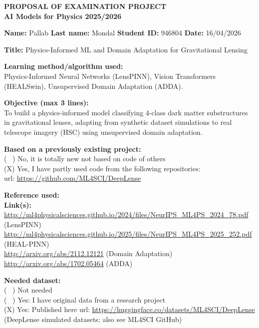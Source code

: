 \documentclass[12pt]{article}
\begin{document}
\begin{center}
    \textbf{\Large PROPOSAL OF EXAMINATION PROJECT} \\
    \vspace{0.2cm}
    \textbf{\large AI Models for Physics 2025/2026}
\end{center}

\vspace{0.5cm}

\noindent
\textbf{Name:} Pallab \hspace{1cm} \textbf{Last name:} Mondal \hspace{1cm} \textbf{Student ID:} 946804 \hspace{1cm} \textbf{Date:} 16/04/2026

\vspace{0.5cm}

\noindent
\textbf{Title:} Physics-Informed ML and Domain Adaptation for Gravitational Lensing

\vspace{0.5cm}

\noindent
\textbf{Learning method/algorithm used:} \\
Physics-Informed Neural Networks (LensPINN), Vision Transformers (HEALSwin), Unsupervised Domain Adaptation (ADDA).

\vspace{0.5cm}

\noindent
\textbf{Objective (max 3 lines):} \\
To build a physics-informed model classifying 4-class dark matter substructures in gravitational lenses, adapting from synthetic dataset simulations to real telescope imagery (HSC) using unsupervised domain adaptation.

\vspace{0.5cm}

\noindent
\textbf{Based on a previously existing project:} \\
( \ ) No, it is totally new not based on code of others \\
(X) Yes, I have partly used code from the following repositories: \\
url: \url{https://github.com/ML4SCI/DeepLense}

\vspace{0.5cm}

\noindent
\textbf{Reference used:} \\
\textbf{Link(s):} \\
\url{http://ml4physicalsciences.github.io/2024/files/NeurIPS_ML4PS_2024_78.pdf} (LensPINN) \\
\url{http://ml4physicalsciences.github.io/2025/files/NeurIPS_ML4PS_2025_252.pdf} (HEAL-PINN) \\
\url{http://arxiv.org/abs/2112.12121} (Domain Adaptation) \\
\url{http://arxiv.org/abs/1702.05464} (ADDA)

\vspace{0.5cm}

\noindent
\textbf{Needed dataset:} \\
( \ ) Not needed \\
( \ ) Yes: I have original data from a research project \\
(X) Yes: Published here url: \url{https://huggingface.co/datasets/ML4SCI/DeepLense} (DeepLense simulated datasets; also see ML4SCI GitHub)
\end{document}
